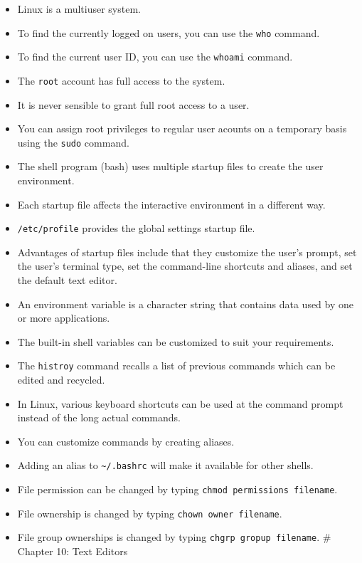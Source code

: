 \begin{itemize}
\itemsep1pt\parskip0pt
\item
  Linux is a multiuser system.
\item
  To find the currently logged on users, you can use the \texttt{who}
  command.
\item
  To find the current user ID, you can use the \texttt{whoami} command.
\item
  The \texttt{root} account has full access to the system.
\item
  It is never sensible to grant full root access to a user.
\item
  You can assign root privileges to regular user acounts on a temporary
  basis using the \texttt{sudo} command.
\item
  The shell program (bash) uses multiple startup files to create the
  user environment.
\item
  Each startup file affects the interactive environment in a different
  way.
\item
  \texttt{/etc/profile} provides the global settings startup file.
\item
  Advantages of startup files include that they customize the user's
  prompt, set the user's terminal type, set the command-line shortcuts
  and aliases, and set the default text editor.
\item
  An environment variable is a character string that contains data used
  by one or more applications.
\item
  The built-in shell variables can be customized to suit your
  requirements.
\item
  The \texttt{histroy} command recalls a list of previous commands which
  can be edited and recycled.
\item
  In Linux, various keyboard shortcuts can be used at the command prompt
  instead of the long actual commands.
\item
  You can customize commands by creating aliases.
\item
  Adding an alias to \texttt{\textasciitilde{}/.bashrc} will make it
  available for other shells.
\item
  File permission can be changed by typing
  \texttt{chmod permissions filename}.
\item
  File ownership is changed by typing \texttt{chown owner filename}.
\item
  File group ownerships is changed by typing
  \texttt{chgrp gropup filename}. \# Chapter 10: Text Editors
\end{itemize}

